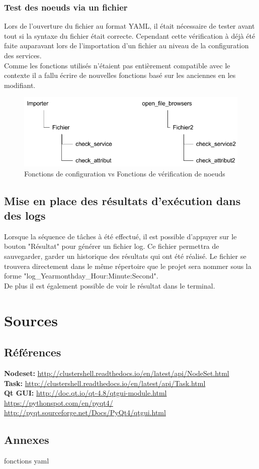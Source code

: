 \documentclass[a4paper,11pt]{article}
\begin{document}
\subsubsection{Test des noeuds via un fichier}
Lors de l'ouverture du fichier au format YAML, il était nécessaire de tester avant tout si la syntaxe du fichier était correcte. Cependant cette vérification à déjà été faite auparavant lors de l'importation d'un fichier au niveau de la configuration des services.\\
Comme les fonctions utilisés n’étaient pas entièrement compatible avec le contexte il a fallu écrire de nouvelles fonctions basé sur les anciennes en les modifiant.\\
\begin{figure}[hbtp]
\centering
\includegraphics[scale=0.5]{difference_importer_openfile.png}
\caption{Fonctions de configuration vs Fonctions de vérification de noeuds}
\end{figure}



\subsection{Mise en place des résultats d'exécution dans des logs}
Lorsque la séquence de tâches à été effectué, il est possible d'appuyer sur le bouton "Résultat" pour générer un fichier log. Ce fichier permettra de sauvegarder, garder un historique des résultats qui ont été réalisé. Le fichier se trouvera directement dans le même répertoire que le projet sera nommer sous la forme "log\_Year\-month\-day\_Hour:Minute:Second".\\
De plus il est également possible de voir le résultat dans le terminal.	

\section{Sources}
\label{sec:section6}
\subsection{Références}
\noindent\textbf{Nodeset:} \url{http://clustershell.readthedocs.io/en/latest/api/NodeSet.html}\\
\textbf{Task:} \url{http://clustershell.readthedocs.io/en/latest/api/Task.html}\\
\textbf{Qt GUI:} \url {http://doc.qt.io/qt-4.8/qtgui-module.html}\\
\url {https://pythonspot.com/en/pyqt4/}\\
\url {http://pyqt.sourceforge.net/Docs/PyQt4/qtgui.html} 

\subsection{Annexes}

fonctions yaml
\end{document}
